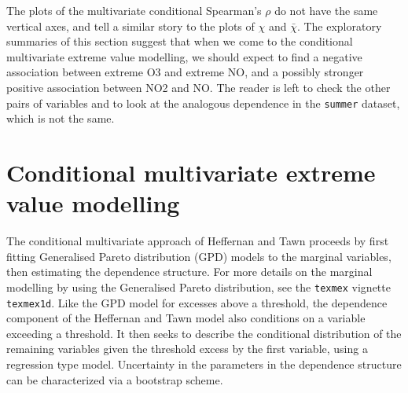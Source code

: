 \documentclass[10pt]{article}\usepackage[]{graphicx}\usepackage[]{color}
\begin{document}
The plots of the multivariate conditional Spearman's $\rho$
  do not have the same vertical axes, and tell a similar story
to the plots of $\chi$ and $\bar\chi$. The exploratory summaries of this section suggest that when we come
to the conditional multivariate extreme value modelling, we should
expect to find a negative association between extreme O3 and extreme
NO, and a possibly stronger positive association between NO2 and NO. The reader is
left to check the other pairs of variables and to look at the analogous dependence in the {\tt summer} dataset, which is not the same.

\pagebreak
\newpage
\clearpage

%
\section{Conditional multivariate extreme value modelling}
%
The conditional multivariate approach of Heffernan and Tawn
proceeds by first fitting Generalised Pareto distribution (GPD) models to the marginal variables,
then estimating the dependence structure. For more details on the marginal modelling by using the Generalised Pareto distribution, see the {\tt texmex} vignette {\tt texmex1d}. Like the GPD model for excesses above a threshold, the dependence component of the Heffernan and Tawn model also conditions on a variable exceeding a threshold.  It then seeks to describe the conditional distribution of the remaining variables given the threshold excess by the first variable, using a regression type model.  Uncertainty in the
parameters in the dependence structure can be characterized via
a bootstrap scheme.
%
\end{document}
